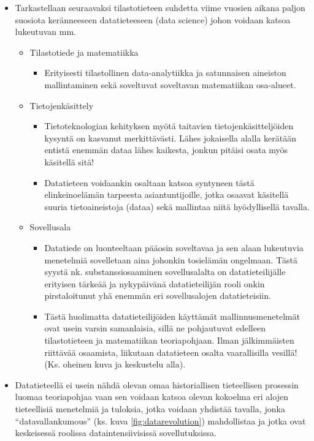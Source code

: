 \documentclass[
]{book}
\providecommand{\tightlist}{%
  \setlength{\itemsep}{0pt}\setlength{\parskip}{0pt}}
\begin{document}
\begin{itemize}
\tightlist
\item
  Tarkastellaan seuraavaksi tilastotieteen suhdetta viime vuosien aikana paljon suosiota keränneeseen datatieteeseen (data science) johon voidaan katsoa lukeutuvan mm.

  \begin{itemize}
  \tightlist
  \item
    Tilastotiede ja matematiikka

    \begin{itemize}
    \tightlist
    \item
      Erityisesti tilastollinen data-analytiikka ja satunnaisen aineiston mallintaminen sekä soveltuvat soveltavan matematiikan osa-alueet.
    \end{itemize}
  \item
    Tietojenkäsittely

    \begin{itemize}
    \tightlist
    \item
      Tietoteknologian kehityksen myötä taitavien tietojenkäsitteljöiden kysyntä on kasvanut merkittävästi. Lähes jokaisella alalla kerätään entistä enemmän dataa lähes kaikesta, jonkun pitäisi osata myös käsitellä sitä!
    \item
      Datatieteen voidaankin osaltaan katsoa syntyneen tästä elinkeinoelämän tarpeesta asiantuntijoille, jotka osaavat käsitellä suuria tietoaineistoja (dataa) sekä mallintaa niitä hyödyllisellä tavalla.
    \end{itemize}
  \item
    Sovellusala

    \begin{itemize}
    \tightlist
    \item
      Datatiede on luonteeltaan pääosin soveltavaa ja sen alaan lukeutuvia menetelmiä sovelletaan aina johonkin tosielämän ongelmaan. Tästä syystä nk. substanssiosaaminen sovellusalalta on datatieteilijälle erityisen tärkeää ja nykypäivänä datatieteilijän rooli onkin pirstaloitunut yhä enemmän eri sovellusalojen datatieteisiin.
    \item
      Tästä huolimatta datatieteilijöiden käyttämät mallinnusmenetelmät ovat usein varsin samanlaisia, sillä ne pohjautuvat edelleen tilastotieteen ja matematiikan teoriapohjaan. Ilman jälkimmäisten riittävää osaamista, liikutaan datatieteen osalta vaarallisilla vesillä! (Ks. oheinen kuva ja keskustelu alla).\\
    \end{itemize}
  \end{itemize}
\item
  Datatieteellä ei usein nähdä olevan omaa historiallisen tieteellisen prosessin luomaa teoriapohjaa vaan sen voidaan katsoa olevan kokoelma eri alojen tieteellisiä menetelmiä ja tuloksia, jotka voidaan yhdistää tavalla, jonka ``datavallankumous'' (ks. kuva \ref{fig:datarevolution}) mahdollistaa ja jotka ovat keskeisessä roolissa dataintensiivisissä sovellutuksissa.
\end{itemize}
\end{document}
